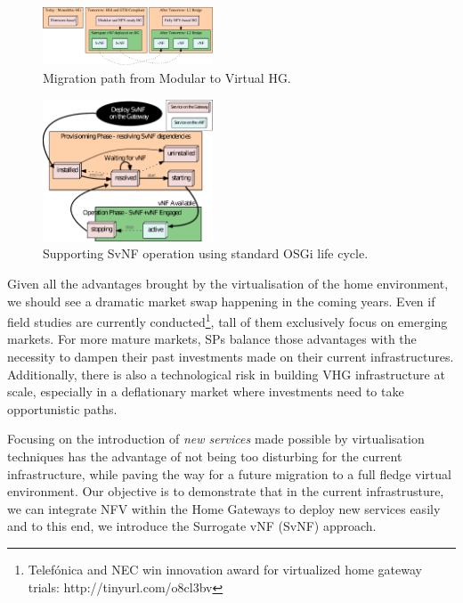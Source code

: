 \begin{figure}
  \begin{center}
    \includegraphics[width=0.45\textwidth]{fig/migrationPath.pdf}
  \end{center}
  \caption{ Migration path from Modular to Virtual HG.
    \label{fig:migration}
  }
\end{figure}	

\begin{figure}
	
	\center

	\includegraphics[width=0.45\textwidth]{fig/osgi.pdf}
	\caption{ Supporting SvNF operation using standard OSGi life cycle.
    \label{fig:osgisvnf}
    }

\end{figure}
	   

Given all the advantages brought by the virtualisation of the home environment, we should see a dramatic market swap  happening in the coming years.
Even if field studies are currently conducted\footnote{Telefónica and NEC win innovation award for virtualized home gateway trials: http://tinyurl.com/o8cl3bv}, tall of them exclusively focus on emerging markets.
For more mature markets, SPs balance those advantages with the necessity to dampen their past investments made on their current infrastructures.
Additionally, there is also a technological risk in building VHG infrastructure at scale, especially in a deflationary market where investments need to take opportunistic paths. 

Focusing on the introduction of \textit{new services} made possible by virtualisation techniques has the advantage of not being too disturbing for the current infrastructure, while paving the way for a future migration to a full fledge virtual environment. 
Our objective is to demonstrate that in the current infrastrusture, we can integrate NFV within the Home Gateways to deploy new services easily and to this end, we introduce the Surrogate vNF (SvNF) approach.

